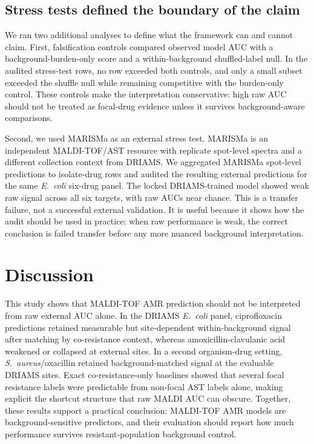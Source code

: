 \documentclass[11pt]{article}
\begin{document}
\subsection*{Stress tests defined the boundary of the claim}

We ran two additional analyses to define what the framework can and cannot claim. First, falsification controls compared observed model AUC with a background-burden-only score and a within-background shuffled-label null. In the audited stress-test rows, no row exceeded both controls, and only a small subset exceeded the shuffle null while remaining competitive with the burden-only control. These controls make the interpretation conservative: high raw AUC should not be treated as focal-drug evidence unless it survives background-aware comparisons.

Second, we used MARISMa as an external stress test. MARISMa is an independent MALDI-TOF/AST resource with replicate spot-level spectra and a different collection context from DRIAMS. We aggregated MARISMa spot-level predictions to isolate-drug rows and audited the resulting external predictions for the same \textit{E.~coli} six-drug panel. The locked DRIAMS-trained model showed weak raw signal across all six targets, with raw AUCs near chance. This is a transfer failure, not a successful external validation. It is useful because it shows how the audit should be used in practice: when raw performance is weak, the correct conclusion is failed transfer before any more nuanced background interpretation.

\section*{Discussion}

This study shows that MALDI-TOF AMR prediction should not be interpreted from raw external AUC alone. In the DRIAMS \textit{E.~coli} panel, ciprofloxacin predictions retained measurable but site-dependent within-background signal after matching by co-resistance context, whereas amoxicillin-clavulanic acid weakened or collapsed at external sites. In a second organism-drug setting, \textit{S.~aureus}/oxacillin retained background-matched signal at the evaluable DRIAMS sites. Exact co-resistance-only baselines showed that several focal resistance labels were predictable from non-focal AST labels alone, making explicit the shortcut structure that raw MALDI AUC can obscure. Together, these results support a practical conclusion: MALDI-TOF AMR models are background-sensitive predictors, and their evaluation should report how much performance survives resistant-population background control.
\end{document}
